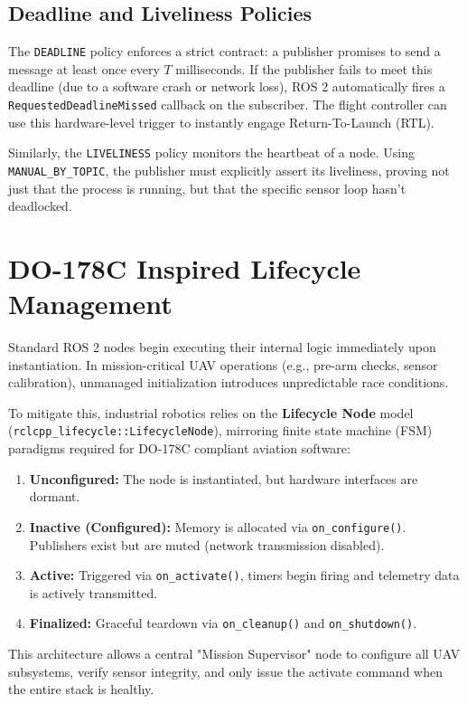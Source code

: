 \documentclass{article}
\begin{document}
\subsection{Deadline and Liveliness Policies}
The \texttt{DEADLINE} policy enforces a strict contract: a publisher promises to send a message at least once every $T$ milliseconds. 
If the publisher fails to meet this deadline (due to a software crash or network loss), ROS 2 automatically fires a 
\texttt{RequestedDeadlineMissed} callback on the subscriber. The flight controller can use this hardware-level trigger to instantly engage 
Return-To-Launch (RTL).

Similarly, the \texttt{LIVELINESS} policy monitors the heartbeat of a node. 
Using \texttt{MANUAL\_BY\_TOPIC}, the publisher must explicitly assert its liveliness, proving not just that the process is running, 
but that the specific sensor loop hasn't deadlocked.

\section{DO-178C Inspired Lifecycle Management}
Standard ROS 2 nodes begin executing their internal logic immediately upon instantiation. 
In mission-critical UAV operations (e.g., pre-arm checks, sensor calibration), unmanaged initialization introduces unpredictable race conditions. 

To mitigate this, industrial robotics relies on the \textbf{Lifecycle Node} model (\texttt{rclcpp\_lifecycle::LifecycleNode}),
mirroring finite state machine (FSM) paradigms required for DO-178C compliant aviation software:
\begin{enumerate}
    \item \textbf{Unconfigured:} The node is instantiated, but hardware interfaces are dormant.
    \item \textbf{Inactive (Configured):} Memory is allocated via \texttt{on\_configure()}. Publishers exist but are muted (network transmission disabled).
    \item \textbf{Active:} Triggered via \texttt{on\_activate()}, timers begin firing and telemetry data is actively transmitted.
    \item \textbf{Finalized:} Graceful teardown via \texttt{on\_cleanup()} and \texttt{on\_shutdown()}.
\end{enumerate}
This architecture allows a central "Mission Supervisor" node to configure all UAV subsystems, verify sensor integrity, 
and only issue the activate command when the entire stack is healthy.
\end{document}
